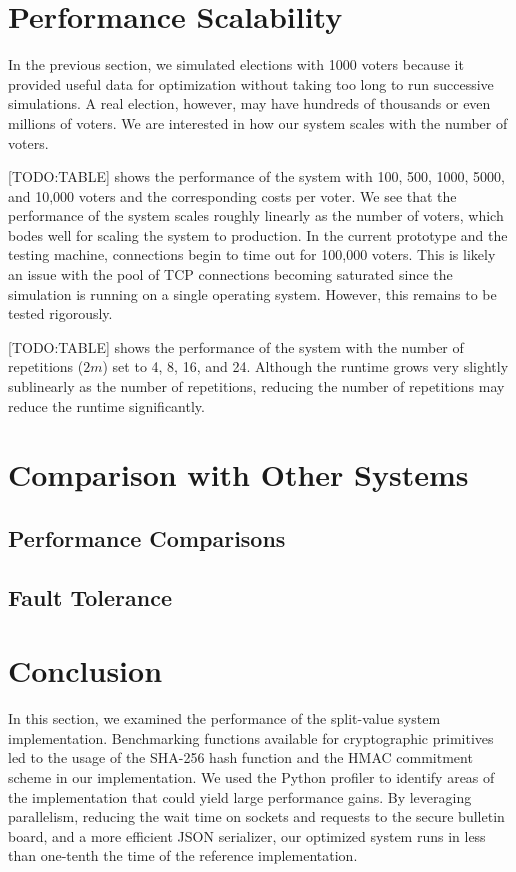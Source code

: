 \section{Performance Scalability}

In the previous section, we simulated elections with 1000 voters because it provided useful data for optimization without taking too long to run successive simulations. A real election, however, may have hundreds of thousands or even millions of voters. We are interested in how our system scales with the number of voters.

[TODO:TABLE] shows the performance of the system with 100, 500, 1000, 5000, and 10,000 voters and the corresponding costs per voter. We see that the performance of the system scales roughly linearly as the number of voters, which bodes well for scaling the system to production. In the current prototype and the testing machine, connections begin to time out for 100,000 voters. This is likely an issue with the pool of TCP connections becoming saturated since the simulation is running on a single operating system. However, this remains to be tested rigorously.

[TODO:TABLE] shows the performance of the system with the number of repetitions ($2m$) set to 4, 8, 16, and 24. Although the runtime grows very slightly sublinearly as the number of repetitions, reducing the number of repetitions may reduce the runtime significantly.

\section{Comparison with Other Systems}

\subsection{Performance Comparisons}

\subsection{Fault Tolerance}

\section{Conclusion}

In this section, we examined the performance of the split-value system implementation. Benchmarking functions available for cryptographic primitives led to the usage of the SHA-256 hash function and the HMAC commitment scheme in our implementation. We used the Python profiler to identify areas of the implementation that could yield large performance gains. By leveraging parallelism, reducing the wait time on sockets and requests to the secure bulletin board, and a more efficient JSON serializer, our optimized system runs in less than one-tenth the time of the reference implementation.

